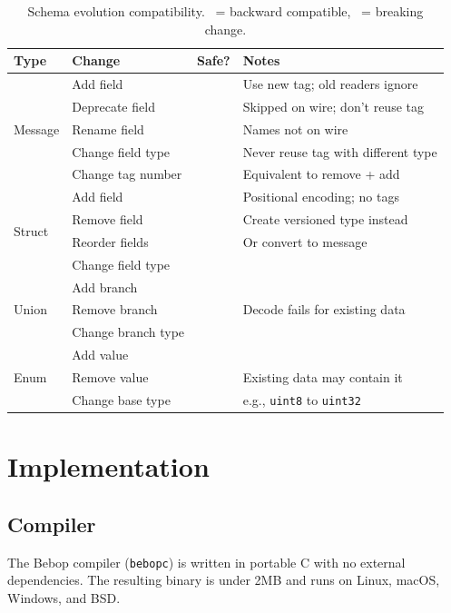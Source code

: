 \documentclass[10pt,onecolumn]{article}
\newcommand{\cmark}{\ding{51}}
\newcommand{\xmark}{\ding{55}}
\begin{document}
\begin{table}[ht]
\centering
\small
\begin{tabular}{@{}llcl@{}}
\toprule
\textbf{Type} & \textbf{Change} & \textbf{Safe?} & \textbf{Notes} \\
\midrule
\multirow{5}{*}{Message}
  & Add field & \cmark & Use new tag; old readers ignore \\
  & Deprecate field & \cmark & Skipped on wire; don't reuse tag \\
  & Rename field & \cmark & Names not on wire \\
  & Change field type & \xmark & Never reuse tag with different type \\
  & Change tag number & \xmark & Equivalent to remove + add \\
\midrule
\multirow{4}{*}{Struct}
  & Add field & \xmark & Positional encoding; no tags \\
  & Remove field & \xmark & Create versioned type instead \\
  & Reorder fields & \xmark & Or convert to message \\
  & Change field type & \xmark & \\
\midrule
\multirow{3}{*}{Union}
  & Add branch & \cmark & \\
  & Remove branch & \xmark & Decode fails for existing data \\
  & Change branch type & \xmark & \\
\midrule
\multirow{3}{*}{Enum}
  & Add value & \cmark & \\
  & Remove value & \xmark & Existing data may contain it \\
  & Change base type & \xmark & e.g., \texttt{uint8} to \texttt{uint32} \\
\bottomrule
\end{tabular}
\caption{Schema evolution compatibility. \cmark\ = backward compatible, \xmark\ = breaking change.}
\end{table}


\newpage
\section{Implementation}

\subsection{Compiler}

The Bebop compiler (\texttt{bebopc}) is written in portable C with no external dependencies. The resulting binary is under 2MB and runs on Linux, macOS, Windows, and BSD.
\end{document}
